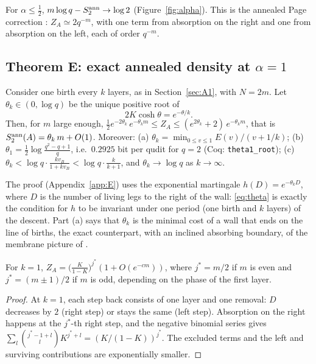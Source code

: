 For $\alpha\le\frac12$, $m\log q-S_2^{\mathrm{ann}}\to\log 2$ (Figure~\ref{fig:alpha}). This is the annealed Page correction \cite{Page1993}: $Z_A\simeq 2q^{-m}$, with one term from absorption on the right and one from absorption on the left, each of order $q^{-m}$.

\subsection{Theorem E: exact annealed density at $\alpha=1$}

\begin{theoremL}\label{thm:E}
Consider one birth every $k$ layers, as in Section~\ref{sec:A1}, with $N=2m$. Let $\theta_k\in(0,\log q)$ be the unique positive root of
\begin{equation}\label{eq:theta}
2K\cosh\theta=e^{-\theta/k}.
\end{equation}
Then, for $m$ large enough, $\tfrac12 e^{-2\theta_k}\,e^{-\theta_k m}\le Z_A\le (e^{2\theta_k}+2)\,e^{-\theta_k m}$, that is $S_2^{\mathrm{ann}}(A)=\theta_k\,m+O(1)$. Moreover:
(a) $\theta_k=\min_{0\le v\le1}E(v)/(v+1/k)$;
(b) $\theta_1=\frac12\log\frac{q^2-q+1}{q}$, i.e.\ $0.2925$ bit per qudit for $q=2$ (Coq: \texttt{theta1\_root});
(c) $\theta_k<\log q\cdot\frac{kv_B}{1+kv_B}<\log q\cdot\frac{k}{k+1}$, and $\theta_k\to\log q$ as $k\to\infty$.
\end{theoremL}

The proof (Appendix~\ref{app:E}) uses the exponential martingale $h(D)=e^{-\theta_kD}$, where $D$ is the number of living legs to the right of the wall: \eqref{eq:theta} is exactly the condition for $h$ to be invariant under one period (one birth and $k$ layers) of the descent. Part (a) says that $\theta_k$ is the minimal cost of a wall that ends on the line of births, the exact counterpart, with an inclined absorbing boundary, of the membrane picture of \cite{ZhouNahum2019,ZhouNahum2020}.

\begin{proposition}[closed form for $k=1$]\label{prop:k1}
For $k=1$, $Z_A=\bigl(\frac{K}{1-K}\bigr)^{j^\ast}(1+O(e^{-cm}))$, where $j^\ast=m/2$ if $m$ is even and $j^\ast=(m\pm1)/2$ if $m$ is odd, depending on the phase of the first layer.
\end{proposition}
\begin{proof}
At $k=1$, each step back consists of one layer and one removal: $D$ decreases by $2$ (right step) or stays the same (left step). Absorption on the right happens at the $j^\ast$-th right step, and the negative binomial series gives $\sum_l\binom{j^\ast-1+l}{l}K^{j^\ast+l}=(K/(1-K))^{j^\ast}$. The excluded terms and the left and surviving contributions are exponentially smaller.
\end{proof}

